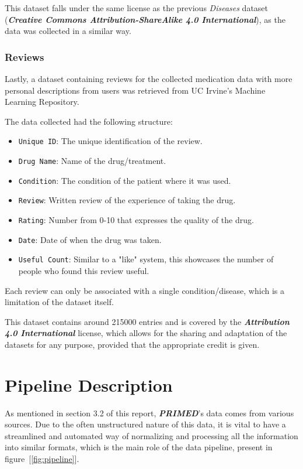 \documentclass[sigconf]{acmart}
\begin{document}
This dataset falls under the same license as the previous \textit{Diseases} dataset (\textit{\textbf{Creative Commons Attribution-ShareAlike 4.0 International}}), as the data was collected in a similar way.

\subsubsection{Reviews}

Lastly, a dataset containing reviews for the collected medication data with more personal descriptions from users\cite{reviews_dataset} was retrieved from UC Irvine's Machine Learning Repository\cite{irvine}.

The data collected had the following structure:
\begin{itemize}
	\item {\texttt{Unique ID}}: The unique identification of the review.
	\item {\texttt{Drug Name}}: Name of the drug/treatment.
	\item {\texttt{Condition}}: The condition of the patient where it was used.
	\item {\texttt{Review}}: Written review of the experience of taking the drug.
	\item {\texttt{Rating}}: Number from 0-10 that expresses the quality of the drug.
    \item {\texttt{Date}}: Date of when the drug was taken.
    \item {\texttt{Useful Count}}: Similar to a "like" system, this showcases the number of people who found this review useful.
\end{itemize}

Each review can only be associated with a single condition/disease, which is a limitation of the dataset itself.

This dataset contains around 215000 entries and is covered by the \textit{\textbf{Attribution 4.0 International}}\cite{ccfour} license, which allows for the sharing and adaptation of the datasets for any purpose, provided that the appropriate credit is given.

\section{Pipeline Description}

As mentioned in section 3.2 of this report, \textit{\textbf{PRIMED}}'s data comes from various sources. Due to the often unstructured nature of this data, it is vital to have a streamlined and automated way of normalizing and processing all the information into similar formats, which is the main role of the data pipeline, present in figure~[\ref{fig:pipeline}].
\end{document}
